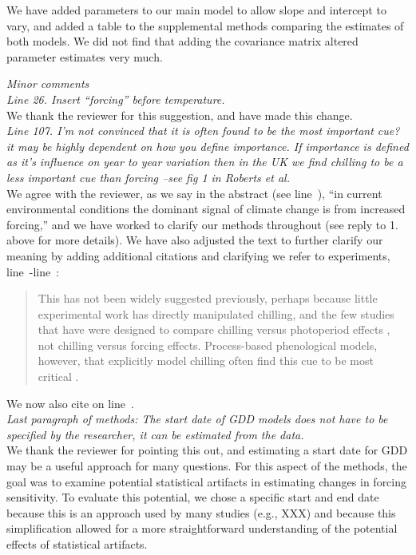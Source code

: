 \documentclass[11pt, a4paper]{article}
\newcommand{\lr}[1]{line~\lineref{#1}}
\begin{document}
We have added parameters to our main model to allow slope and intercept to vary, and added a table to the supplemental methods comparing the estimates of both models. We did not find that adding the covariance matrix altered parameter estimates very much.

\emph{Minor comments}\\

\emph{Line 26. Insert ``forcing'' before temperature.}\\

We thank the reviewer for this suggestion, and have made this change.\\ %

\emph{Line 107. I'm not convinced that it is often found to be the most important cue? it may be highly
dependent on how you define importance. If importance is defined as it's influence on year to year
variation then in the UK we find chilling to be a less important cue than forcing --see fig 1 in Roberts et
al.}\\

We agree with the reviewer, as we say in the abstract (see \lr{unifydebateend}), ``in current environmental conditions the dominant signal of climate change is from increased forcing,'' and we have worked to clarify our methods throughout (see reply to 1. above for more details). We have also adjusted the text to further clarify our meaning by adding additional citations and clarifying we refer to experiments, \lr{eeXstart}-\lr{eeXend}:
\begin{quote}
This has not been widely suggested previously, perhaps because little experimental work has directly manipulated chilling, and the few studies that have were designed to compare chilling versus photoperiod effects \emph{\citep[e.g.,][]{zohner2016,Basler:2014aa,Caffarra:2011qf,Laube:2014a}}, not chilling versus forcing effects. Process-based phenological models, however, that explicitly model chilling often find this cue to be most critical \emph{\citep[e.g.,][]{gauzere2019,Laube:2014a,Heide:2005aa}}.
\end{quote}
We now also cite \citet{roberts2015} on \lr{addedroberts}.\\

\emph{Last paragraph of methods: The start date of GDD models does not have to be specified by the
researcher, it can be estimated from the data.}\\

We thank the reviewer for pointing this out, and estimating a start date for GDD \citep[as done in][]{roberts2015} may be a useful approach for many questions. For this aspect of the methods, the goal was to examine potential statistical artifacts in estimating changes in forcing sensitivity. To evaluate this potential, we chose a specific start and end date because this is an approach used by many studies (e.g., XXX) and because this simplification allowed for a more straightforward understanding of the potential effects of statistical artifacts.\\
\end{document}
